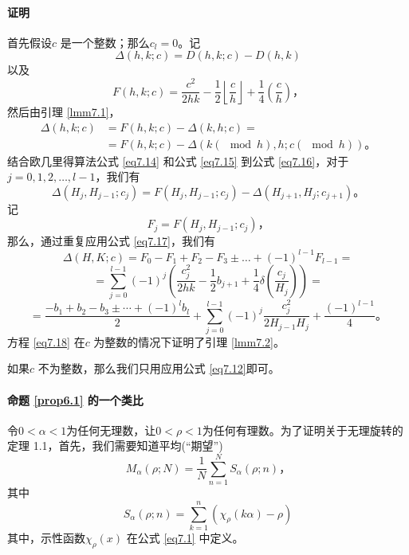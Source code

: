 \documentclass[11pt,a4paper]{article}
\theoremstyle{definition}
\newcommand{\refeq}[1]{公式 \ref{#1}}
\newcommand{\refprop}[1]{命题 \ref{#1}}
\newcommand{\reflmm}[1]{引理 \ref{#1}}
\numberwithin{equation}{section}
\newcommand{\comma}{\text{，}}
\newcommand{\juhao}{\text{。}}
\newcommand{\myone}[1]{\left(-1\right)^{#1}}
\newcommand{\QEDopen}{{\setlength{\fboxsep}{0pt}\setlength{\fboxrule}{0.2pt}\fbox{\rule[0pt]{0pt}{1.3ex}\rule[0pt]{1.3ex}{0pt}}}}
\begin{document}
\paragraph{证明} 首先假设$ c $ 是一个整数；那么$ c_{l}=0 $。记
\[ \Delta\left(h,k;c\right)=D\left(h,k;c\right)-D\left(h,k\right) \]
以及
\[ F\left(h,k;c\right)=\dfrac{c^{2}}{2hk}-\dfrac{1}{2}\left \lfloor\dfrac{c}{h} \right\rfloor+\dfrac{1}{4}\left(\dfrac{c}{h}\right)\comma \]
然后由\reflmm{lmm7.1}，
\begin{equation}\label{eq7.16}
\begin{split}
	\Delta\left(h,k;c\right)&=F\left(h,k;c\right)-	\Delta\left(k,h;c\right)=
	\\&=F\left(h,k;c\right)-\Delta\left(k\left(\!\!\!\mod h\right),h;c\left(\!\!\!\mod h\right)\right)\juhao
	\end{split}
\end{equation}
结合欧几里得算法\refeq{eq7.14} 和\refeq{eq7.15} 到\refeq{eq7.16}，对于$ j=0,1,2,\ldots,l-1 $，我们有
\begin{equation}\label{eq7.17}
\Delta\left(H_{j},H_{j-1};c_{j}\right)=F\left(H_{j},H_{j-1};c_{j}\right)-\Delta\left(H_{j+1},H_{j};c_{j+1}\right)\juhao
\end{equation}
记
\[ F_{j}=F\left(H_{j},H_{j-1};c_{j}\right)\comma \]
那么，通过重复应用\refeq{eq7.17}，我们有
\[ \Delta\left(H,K;c\right)=F_{0}-F_{1}+F_{2}-F_{3}\pm\ldots+\myone{l-1}F_{l-1}= \]
\[ =\sum_{j=0}^{l-1}\myone{j}\left(\dfrac{c_{j}^{2}}{2hk}-\dfrac{1}{2}b_{j+1}+\dfrac{1}{4}\delta\left(\dfrac{c_{j}}{H_{j}}\right)\right)= \]
\begin{equation}\label{eq7.18}
=\dfrac{-b_{1}+b_{2}-b_{3}\pm\cdots+\myone{l}b_{l}}{2}+\sum_{j=0}^{l-1}\myone{j}\dfrac{c_{j}^{2}}{2H_{j-1}H_{j}}+\dfrac{\myone{l-1}}{4}\juhao
\end{equation}
方程 \ref{eq7.18} 在$ c $ 为整数的情况下证明了\reflmm{lmm7.2}。

如果$ c $ 不为整数，那么我们只用应用\refeq{eq7.12}即可。\hfill\QEDopen

\paragraph{\refprop{prop6.1} 的一个类比} 令$ 0<\alpha<1 $为任何无理数，让$ 0<\rho<1 $为任何有理数。为了证明关于无理旋转的定理 1.1，首先，我们需要知道平均(``期望'')
\begin{equation}\label{eq7.19}
	M_{\alpha}\left(\rho; N\right)=\dfrac{1}{N}\sum_{n=1}^{N}S_{\alpha}\left(\rho;n\right)\comma
\end{equation}
其中
\begin{equation}\label{eq7.20}
S_{\alpha}\left(\rho;n\right)=\sum_{k=1}^{n}\left(\chi_{\rho}\left(k\alpha\right)-\rho\right)
\end{equation}
其中，示性函数$ \chi_{\rho}\left(x\right) $ 在\refeq{eq7.1} 中定义。
\end{document}
